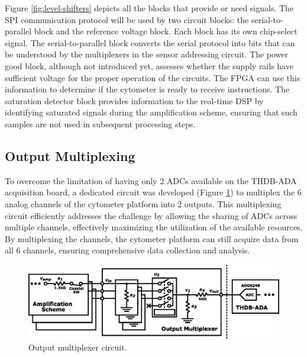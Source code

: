 Figure \ref{fig:level-shifters} depicts all the blocks that provide or need signals. The SPI communication protocol will be used by two circuit blocks: the serial-to-parallel block and the reference voltage block. Each block has its own chip-select signal. The serial-to-parallel block converts the serial protocol into bits that can be understood by the multiplexers in the sensor addressing circuit. The power good block, although not introduced yet, assesses whether the supply rails have sufficient voltage for the proper operation of the circuits. The FPGA can use this information to determine if the cytometer is ready to receive instructions. The saturation detector block provides information to the real-time DSP by identifying saturated signals during the amplification scheme, ensuring that such samples are not used in subsequent processing steps.

\subsection{Output Multiplexing}

To overcome the limitation of having only 2 ADCs available on the THDB-ADA acquisition board, a dedicated circuit was developed (Figure \ref{fig:outmux}) to multiplex the 6 analog channels of the cytometer platform into 2 outputs. This multiplexing circuit efficiently addresses the challenge by allowing the sharing of ADCs across multiple channels, effectively maximizing the utilization of the available resources. By multiplexing the channels, the cytometer platform can still acquire data from all 6 channels, ensuring comprehensive data collection and analysis.

\begin{figure}[!ht]
    \centering
    \includegraphics[width=.475\textwidth]{figs/outmux.eps}
    \caption{Output multiplexer circuit.}
    \label{fig:outmux}
\end{figure}


